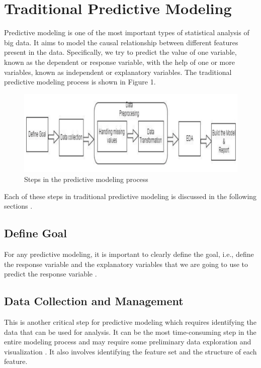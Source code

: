 \documentclass[sigconf]{acmart}
\begin{document}
\section{Traditional Predictive Modeling}

Predictive modeling is one of the most important types of statistical analysis of big data. It aims to model the causal relationship between different features present in the data. Specifically, we try to predict the value of one variable, known as the dependent or response variable, with the help of one or more variables, known as independent or explanatory variables. The traditional predictive modeling process is shown in Figure 1.

\begin{figure}[!ht]
  \centering\includegraphics[width=\columnwidth]{images/Fig1.png}
  \caption{Steps in the predictive modeling process \cite{part-reg}}
  \label{Figure 1}
\end{figure}

Each of these steps in traditional predictive modeling is discussed in the following sections \cite{part-reg}.

\subsection{Define Goal}
For any predictive modeling, it is important to clearly define the goal, i.e., define the response variable and the explanatory variables that we are going to use to predict the response variable \cite{part-reg}.
\subsection{Data Collection and Management} 
This is another critical step for predictive modeling which requires identifying the data that can be used for analysis. It can be the most time-consuming step in the entire modeling process and may require some preliminary data exploration and visualization \cite{part-reg}. It also involves identifying the feature set and the structure of each feature.
\end{document}
